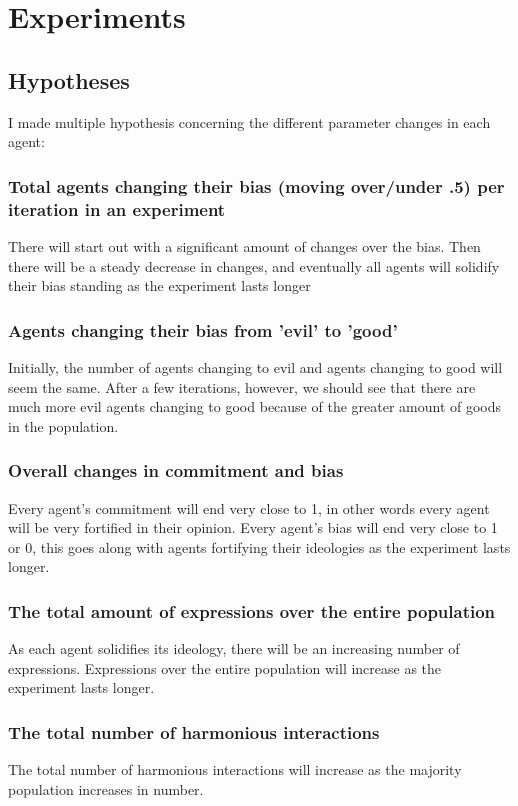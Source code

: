 \documentclass[]{article}
\begin{document}
\section{Experiments}
\subsection{Hypotheses}
I made multiple hypothesis concerning the different parameter changes in each agent: \\
\subsubsection{Total agents changing their bias (moving over/under .5) per iteration in an experiment} There will start out with a significant amount of changes over the bias. Then there will be a steady decrease in changes, and eventually all agents will solidify their bias standing as the experiment lasts longer


\subsubsection{Agents changing their bias from 'evil' to 'good'}Initially, the number of agents changing to evil and agents changing to good will seem the same. After a few iterations, however, we should see that there are much more evil agents changing to good because of the greater amount of goods in the population.

\subsubsection{Overall changes in commitment and bias} Every agent's commitment will end very close to 1, in other words every agent will be very fortified in their opinion. Every agent's bias will end very close to 1 or 0, this goes along with agents fortifying their ideologies as the experiment lasts longer. 


\subsubsection{The total amount of expressions over the entire population} As each agent solidifies its ideology, there will be an increasing number of expressions. Expressions over the entire population will increase as the experiment lasts longer.


\subsubsection{The total number of harmonious interactions} The total number of harmonious interactions  will increase as the majority population increases in number. 
\end{document}
